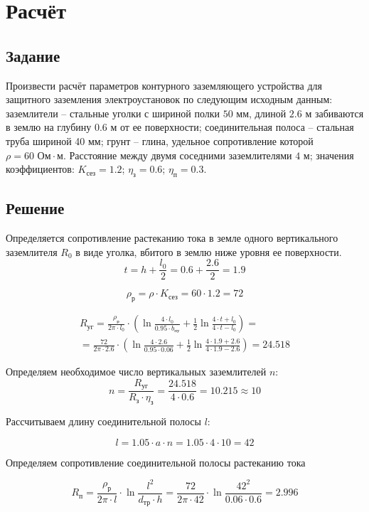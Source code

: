 \chapter{Расчёт}

\section{Задание}
Произвести расчёт параметров контурного заземляющего устройства для защитного заземления электроустановок по следующим исходным данным: заземлители – стальные уголки с шириной полки $50$ мм, длиной $2.$6 м забиваются в землю на глубину $0.6$ м от ее поверхности; соединительная полоса – стальная труба шириной 40 мм; грунт – глина, удельное сопротивление которой $\rho = 60 \text{ Ом} \cdot \text{м}$. Расстояние между двумя соседними заземлителями $4$ м; значения коэффициентов: $K_\text{сез}  = 1.2$; $\eta_\text{з} = 0.6$; $\eta_\text{п} = 0.3$.

\section{Решение}

Определяется сопротивление растеканию тока в земле одного вертикального заземлителя $R_0$ в виде уголка, вбитого в землю ниже уровня ее поверхности.
\[
t = h + \frac{l_0}{2}= 0.6 + \frac{2.6}{2} = 1.9
\]

\[
\rho_\text{р} = \rho \cdot K_\text{сез} = 60 \cdot 1.2 = 72
\]

\begin{multline*}
R_\text{уг} = \frac{\rho_\text{р}}{2 \pi \cdot l_0} \cdot \left( \ln \frac{4 \cdot l_0}{0.95 \cdot b_\text{пу}} + \frac{1}{2} \ln \frac{4\cdot t +l_0}{4\cdot t -l_0} \right) =\\= \frac{72}{2\pi \cdot 2.6} \cdot \left(\ln \frac{4 \cdot 2.6}{0.95 \cdot 0.06} + \frac{1}{2} \ln \frac{4 \cdot 1.9 + 2.6}{4 \cdot 1.9 -2.6} \right) = 24.518
\end{multline*}

Определяем необходимое число вертикальных заземлителей $n$:
\[
n = \frac{R_\text{уг}}{R_\text{з}\cdot \eta_\text{з}} = \frac{24.518}{4 \cdot 0.6} = 10.215 \approx 10
\]

Рассчитываем длину соединительной полосы $l$:

\[
l = 1.05 \cdot a \cdot n = 1.05 \cdot 4 \cdot 10 = 42
\]

Определяем сопротивление соединительной полосы растеканию тока

\[
R_\text{п} = \frac{\rho_\text{р}}{2\pi \cdot l} \cdot \ln \frac{l^2}{d_\text{тр} \cdot h} = \frac{72}{2\pi \cdot 42} \cdot \ln \frac{42^2}{0.06 \cdot 0.6} = 2.996
\]

